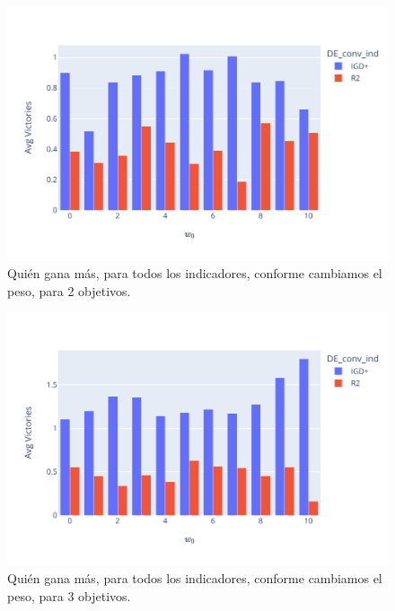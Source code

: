 \begin{figure} [H]
    \centering
    \includegraphics[width=\textwidth]{Figuras/borda_obj_2.pdf}
    \caption[Conteo de borda por número de objetivos]{Quién gana más, para todos los indicadores, conforme cambiamos el peso, para 2 objetivos.}
    \label{fig:borda_obj_2}
\end{figure}

\begin{figure} [H]
    \centering
    \includegraphics[width=\textwidth]{Figuras/borda_obj_3.pdf}
    \caption[Conteo de borda por número de objetivos]{Quién gana más, para todos los indicadores, conforme cambiamos el peso, para 3 objetivos.}
    \label{fig:borda_obj_3}
\end{figure}

